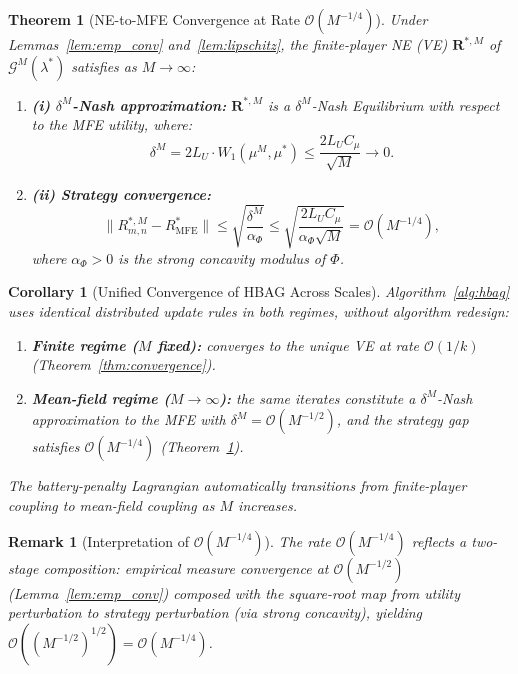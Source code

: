 \documentclass[journal]{IEEEtran}
\newtheorem{theorem}{Theorem}
\newtheorem{corollary}{Corollary}
\newtheorem{remark}{Remark}
\newcommand{\calG}{\mathcal{G}}
\newcommand{\bfR}{\mathbf{R}}
\newcommand{\WassDist}{W_{1}}
\begin{document}
\begin{theorem}[NE-to-MFE Convergence at Rate
$\mathcal{O}(M^{-1/4})$]
\label{thm:mfg}
Under Lemmas~\ref{lem:emp_conv} and~\ref{lem:lipschitz}, the finite-player NE (VE) $\bfR^{*,M}$ of $\calG^M(\lambda^*)$ satisfies as $M\to\infty$:

\begin{enumerate}
    \item \textbf{(i) $\delta^M$-Nash approximation:}
$\bfR^{*,M}$ is a $\delta^M$-Nash Equilibrium with respect to the MFE utility, where:
    \begin{equation}
        \delta^M
        = 2L_U\cdot
        \WassDist(\mu^M,\mu^*)
        \leq \frac{2L_U C_\mu}{\sqrt{M}}
        \to 0.
        \label{eq:delta_ne}
    \end{equation}

    \item \textbf{(ii) Strategy convergence:}
    \begin{equation}
        \|R_{m,n}^{*,M} - R_{\mathrm{MFE}}^*\|
        \leq
        \sqrt{\frac{\delta^M}{\alpha_\Phi}}
        \leq
        \sqrt{\frac{2L_U C_\mu}
        {\alpha_\Phi\sqrt{M}}}
        = \mathcal{O}(M^{-1/4}),
        \label{eq:mfe_rate}
    \end{equation}
where $\alpha_\Phi > 0$ is the strong concavity modulus of $\Phi$.
\end{enumerate}
\end{theorem}

\begin{corollary}[Unified Convergence of HBAG Across Scales]
\label{cor:unified_convergence}
Algorithm~\ref{alg:hbag} uses identical distributed update rules in both regimes, without algorithm redesign:
\begin{enumerate}
    \item \textbf{Finite regime ($M$ fixed):} converges to the unique VE at rate $\mathcal{O}(1/k)$ (Theorem~\ref{thm:convergence}).
    \item \textbf{Mean-field regime ($M\to\infty$):} the same iterates constitute a $\delta^M$-Nash approximation to the MFE with $\delta^M=\mathcal{O}(M^{-1/2})$, and the strategy gap satisfies $\mathcal{O}(M^{-1/4})$ (Theorem~\ref{thm:mfg}).
\end{enumerate}
The battery-penalty Lagrangian automatically transitions from finite-player coupling to mean-field coupling as $M$ increases.
\end{corollary}


\begin{remark}[Interpretation of $\mathcal{O}(M^{-1/4})$]
The rate $\mathcal{O}(M^{-1/4})$ reflects a two-stage composition: empirical measure convergence at $\mathcal{O}(M^{-1/2})$ (Lemma~\ref{lem:emp_conv}) composed with the square-root map from utility perturbation to strategy perturbation (via strong concavity), yielding $\mathcal{O}((M^{-1/2})^{1/2}) = \mathcal{O}(M^{-1/4})$.
\end{remark}
\end{document}
